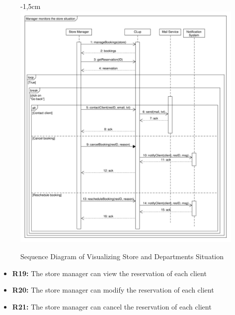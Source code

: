 \documentclass{article}
\begin{document}
\begin{center}
\begin{adjustwidth}{-2.8cm}{}
\begin{tabular}[h!]{|m{7.5em}|m{36em}|}
						\end{tabular}
					\end{adjustwidth}
				\newpage
					\begin{figure}[!h]
						\begin{adjustwidth} {-1,5cm}{}
							\centering
							\includegraphics[scale=0.42]{SD/9_manageReservations(store)}\\
							\caption{Sequence Diagram of Visualizing Store and Departments Situation}
						\end{adjustwidth}
					\end{figure}
					\begin{itemize}
						\medskip
						
						{\bfseries Required functional requirements: }
						
						
						\item {\bfseries R19: }  The store manager can view the reservation of each client
						\item {\bfseries R20: } The store manager can modify the reservation of each client
						\item {\bfseries R21: } The store manager can cancel the reservation of each client
						

					\end{itemize}	
					
				\end{center}
			\bigskip
			\bigskip
			\bigskip
			\bigskip
\end{document}
